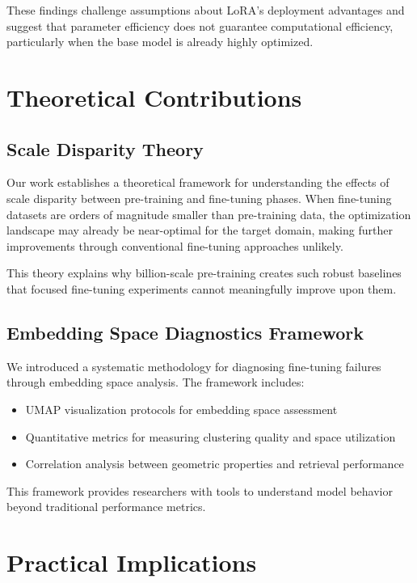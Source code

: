These findings challenge assumptions about LoRA's deployment advantages and suggest that parameter efficiency does not guarantee computational efficiency, particularly when the base model is already highly optimized.

\section{Theoretical Contributions}

\subsection{Scale Disparity Theory}

Our work establishes a theoretical framework for understanding the effects of scale disparity between pre-training and fine-tuning phases. When fine-tuning datasets are orders of magnitude smaller than pre-training data, the optimization landscape may already be near-optimal for the target domain, making further improvements through conventional fine-tuning approaches unlikely.

This theory explains why billion-scale pre-training creates such robust baselines that focused fine-tuning experiments cannot meaningfully improve upon them.

\subsection{Embedding Space Diagnostics Framework}

We introduced a systematic methodology for diagnosing fine-tuning failures through embedding space analysis. The framework includes:

\begin{itemize}
\item UMAP visualization protocols for embedding space assessment
\item Quantitative metrics for measuring clustering quality and space utilization
\item Correlation analysis between geometric properties and retrieval performance
\end{itemize}

This framework provides researchers with tools to understand model behavior beyond traditional performance metrics.

\section{Practical Implications}

